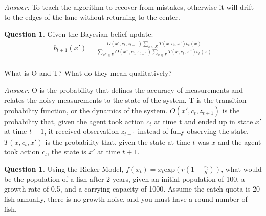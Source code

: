 \documentclass{article}
\theoremstyle{definition}
\newtheorem{question}[thm]{Question}
\newenvironment{answer}{\noindent\textit{Answer:}}{}
\begin{document}
\begin{answer}
To teach the algorithm to recover from mistakes, otherwise it will drift to the edges of the lane without returning to the center.
\end{answer}

\begin{question}
    Given the Bayesian belief update:
\\ \begin{equation*} \begin{aligned} 
b_{t+1}(x') = \frac{O(x', c_t, z_{t+1}) \sum_{x\in X}T(x,c_t,x')b_t(x)}{\sum_{x''\in X}O(x'',c_t,z_{t+1})\sum_{x\in X}T(x,c_t,x'')b_t(x)}
\end{aligned} \end{equation*} 
\\ What is O and T? What do they mean qualitatively?
\end{question}

\begin{answer}
    O is the probability that defines the accuracy of measurements and relates the noisy measurements to the state of the system. T is the transition probability function, or the dynamics of the system. $O(x', c_t, z_{t+1})$ is the probability that, given the agent took action $c_t$ at time t and ended up in state $x'$ at time $t+1$, it received observation $z_{t+1}$ instead of fully observing the state. $T(x,c_t,x')$ is the probability that, given the state at time $t$ was $x$ and the agent took action $c_t$, the state is $x'$ at time $t+1$. 
\end{answer}

\begin{question}
Using the Ricker Model, $f(x_t) = x_t \text{exp}(r(1-\frac{x_t}{K}))$, what would be the population of a fish after 2 years, given an initial population of 100, a growth rate of 0.5, and a carrying capacity of 1000. Assume the catch quota is 20 fish annually, there is no growth noise, and you must have a round number of fish.
\end{question}
\end{document}
